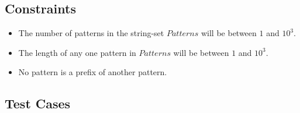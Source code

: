 \documentclass{article}
\begin{document}
\subsection*{Constraints}
\begin{itemize}
    \item The number of patterns in the string-set $Patterns$ will be between $1$ and $10^3$.
    \item The length of any one pattern in $Patterns$ will be between $1$ and $10^3$.
    \item No pattern is a prefix of another pattern.
\end{itemize}
\pagebreak

\subsection*{Test Cases}
\end{document}
